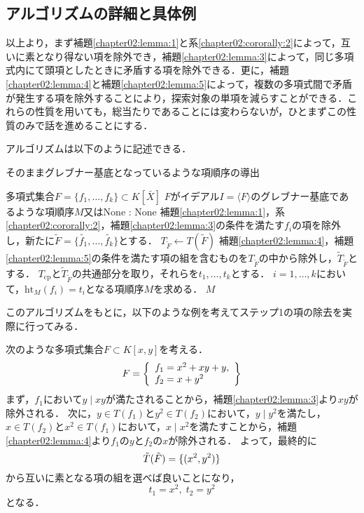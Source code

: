 \subsection{アルゴリズムの詳細と具体例}
以上より，まず補題\ref{chapter02:lemma:1}と系\ref{chapter02:cororally:2}によって，互いに素となり得ない項を除外でき，補題\ref{chapter02:lemma:3}によって，同じ多項式内にて頭項としたときに矛盾する項を除外できる．更に，補題\ref{chapter02:lemma:4}と補題\ref{chapter02:lemma:5}によって，複数の多項式間で矛盾が発生する項を除外することにより，探索対象の単項を減らすことができる．これらの性質を用いても，総当たりであることには変わらないが，ひとまずこの性質のみで話を進めることにする．
\par
アルゴリズムは以下のように記述できる．
\begin{algorithm}
	\label{chapter02:algorithm:1}
	\caption{そのままグレブナー基底となっているような項順序の導出}
	\begin{algorithmic}[1]
		\Require 多項式集合$F=\{f_1, \dots, f_k \} \subset K[\bar{X}]$
		\Ensure $F$がイデアル$I = \langle F \rangle$のグレブナー基底であるような項順序$M$又はNone
		:
			\State \Return None
		\EndIf
		\State 補題\ref{chapter02:lemma:1}，系\ref{chapter02:cororally:2}，補題\ref{chapter02:lemma:3}の条件を満たす$f_i$の項を除外し，新たに$\tilde{F} = \{ \tilde{f_1}, \dots, \tilde{f_k} \}$とする．
		\State $T_{\tilde{F}} \leftarrow T(\tilde{F})$
		\State 補題\ref{chapter02:lemma:4}，補題\ref{chapter02:lemma:5}の条件を満たす項の組を含むものを$T_{\tilde{F}}$の中から除外し，$\tilde{T}_{\tilde{F}}$とする．
		\State $T_{\mathrm{cp}}$と$\tilde{T}_{\tilde{F}}$の共通部分を取り，それらを$t_1, \dots, t_k$とする．
		\State $i = 1, \dots , k$において，$\mathrm{ht}_M(f_i)=t_i$となる項順序$M$を求める．
		\State \Return $M$
	\end{algorithmic}
\end{algorithm}

このアルゴリズムをもとに，以下のような例を考えてステップ1の項の除去を実際に行ってみる．
\begin{example}
	次のような多項式集合$F \subset K[x, y]$を考える．
	\begin{equation}
		F = 
		\left\{
		\begin{array}{l}
			f_1 = x^2 + xy + y, \\
			f_2 = x + y^2 \notag
		\end{array}
		\right\}
	\end{equation}
	まず，$f_1$において$y \mid xy$が満たされることから，補題\ref{chapter02:lemma:3}より$xy$が除外される．
	次に，$y \in T(f_1)$と$y^2 \in T(f_2)$において，$y \mid y^2$を満たし，$x \in T(f_2)$と$x^2 \in T(f_1)$において，$x \mid x^2$を満たすことから，補題\ref{chapter02:lemma:4}より$f_1$の$y$と$f_2$の$x$が除外される．
	よって，最終的に
	\begin{equation}
		\tilde{T}(\tilde{F}) = \{ (x^2, y^2) \} \notag
	\end{equation}
	から互いに素となる項の組を選べば良いことになり，
	$$t_1 = x^2, \; t_2 = y^2$$
	となる．
\end{example}

